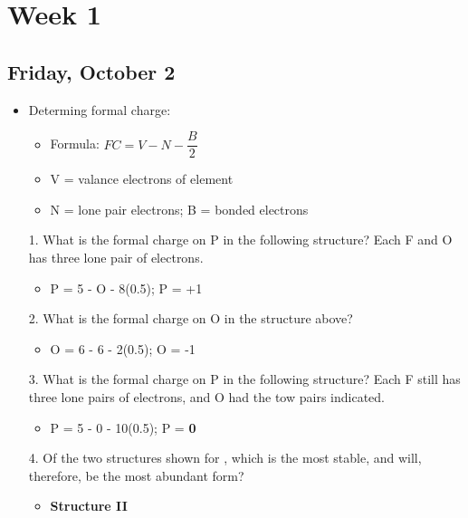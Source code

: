 \documentclass[12pt,a4paper]{article}
\begin{document}

\clearpage
\section*{Week 1}
{}
\subsection{Friday, October 2}
\begin{itemize}
    \item Determing formal charge:
    \begin{itemize}
        \item Formula: {\color{o-Sun}\(FC = V - N - \dfrac{B}{2}\)}
        \item V = valance electrons of element
        \item N = lone pair electrons; B = bonded electrons
    \end{itemize}
    \item[1.] What is the formal charge on P in the following structure?  Each F and O has three lone pair of electrons.
        \begin{itemize}
            \item P = 5 - O - 8(0.5); P = {\color{pos}+1}
        \end{itemize}
    \item[2.] What is the formal charge on O in the structure above?
        \begin{itemize}
            \item O = 6 - 6 - 2(0.5); O = {\color{neg}-1}
        \end{itemize}
    \item[3.] What is the formal charge on P in the following structure?  Each F still has three lone pairs of electrons, and O had the tow pairs indicated.
        \begin{itemize}
            \item P = 5 - 0 - 10(0.5); P = \textbf{0}
        \end{itemize}
    \item[4.] Of the two structures shown for , which is the most stable, and will, therefore, be the most abundant form?
        \begin{itemize}
            \item \textbf{Structure II}

\end{itemize}
\end{itemize}
\end{document}

